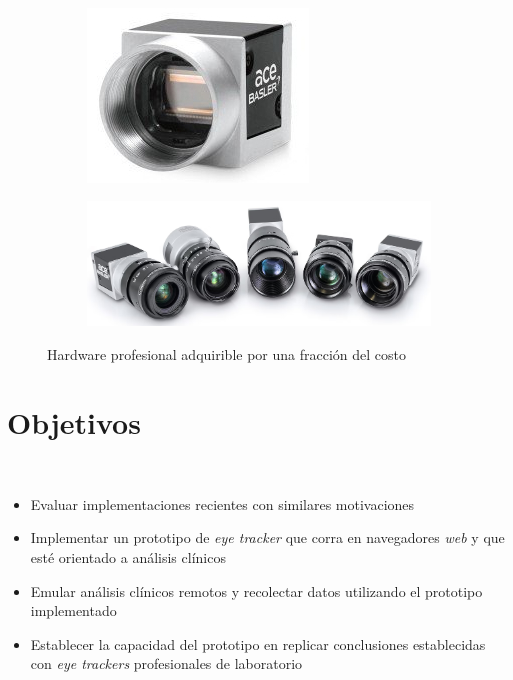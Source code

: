 \documentclass[aspectratio=169]{beamer}
\begin{document}
\begin{frame}{~}
  \begin{figure}
    \begin{subfigure}{0.49\textwidth}
      \centering
      \includegraphics[width=0.35\linewidth]{img/basler-camera.jpg}
    \end{subfigure}
    \begin{subfigure}{0.49\textwidth}
      \centering
      \includegraphics[width=0.6\linewidth]{img/basler-cameras-with-lens.png}
    \end{subfigure}
    \caption{Hardware profesional adquirible por una fracción del costo}
  \end{figure}

\end{frame}

\section{Objetivos}

\begin{frame}{~}

  \begin{itemize}
    \item Evaluar implementaciones recientes con similares motivaciones

    \item Implementar un prototipo de \textit{eye tracker} que corra en
      navegadores \textit{web} y que esté orientado a análisis clínicos

    \item Emular análisis clínicos remotos y recolectar datos utilizando el
      prototipo implementado

    \item Establecer la capacidad del prototipo en replicar conclusiones
      establecidas con \textit{eye trackers} profesionales de laboratorio

  \end{itemize}

\end{frame}
\end{document}
